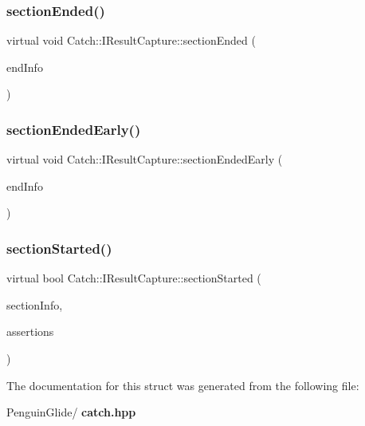 \mbox{\label{struct_catch_1_1_i_result_capture_a4e152bc43dc0933684e31fa67a58195d}} 
\subsubsection{sectionEnded()}
{\footnotesize\ttfamily virtual void Catch\+::\+I\+Result\+Capture\+::section\+Ended (\begin{DoxyParamCaption}\item[{\textbf{ Section\+End\+Info} const \&}]{end\+Info }\end{DoxyParamCaption})\hspace{0.3cm}{\ttfamily [pure virtual]}}

\mbox{\label{struct_catch_1_1_i_result_capture_afcc71eef8ca821ae132cced4a2be6988}} 
\subsubsection{sectionEndedEarly()}
{\footnotesize\ttfamily virtual void Catch\+::\+I\+Result\+Capture\+::section\+Ended\+Early (\begin{DoxyParamCaption}\item[{\textbf{ Section\+End\+Info} const \&}]{end\+Info }\end{DoxyParamCaption})\hspace{0.3cm}{\ttfamily [pure virtual]}}

\mbox{\label{struct_catch_1_1_i_result_capture_a5b76ed52badcb64cf374202e12b81a03}} 
\subsubsection{sectionStarted()}
{\footnotesize\ttfamily virtual bool Catch\+::\+I\+Result\+Capture\+::section\+Started (\begin{DoxyParamCaption}\item[{\textbf{ Section\+Info} const \&}]{section\+Info,  }\item[{\textbf{ Counts} \&}]{assertions }\end{DoxyParamCaption})\hspace{0.3cm}{\ttfamily [pure virtual]}}



The documentation for this struct was generated from the following file\+:\begin{DoxyCompactItemize}
\item 
Penguin\+Glide/\textbf{ catch.\+hpp}\end{DoxyCompactItemize}
